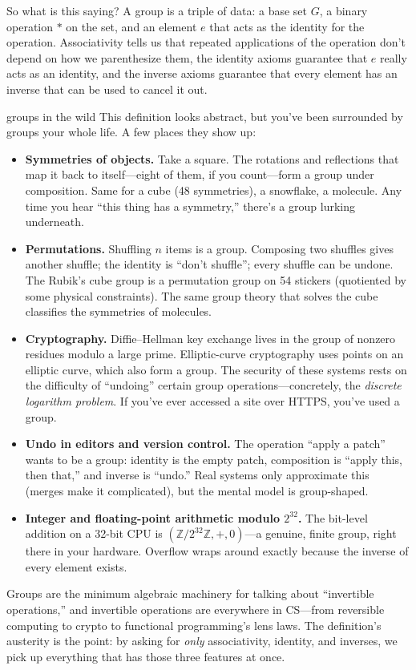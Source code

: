 \documentclass[11pt]{article}
\begin{document}
So what is this saying? A group is a triple of data: a base set $G$, a binary operation $*$ on the set, and an element $e$ that acts as the identity for the operation. Associativity tells us that repeated applications of the operation don't depend on how we parenthesize them, the identity axioms guarantee that $e$ really acts as an identity, and the inverse axioms guarantee that every element has an inverse that can be used to cancel it out.

\begin{sidebar}{groups in the wild}
This definition looks abstract, but you've been surrounded by groups your whole life. A few places they show up:

\begin{itemize}
  \item \textbf{Symmetries of objects.} Take a square. The rotations and reflections that map it back to itself---eight of them, if you count---form a group under composition. Same for a cube (48 symmetries), a snowflake, a molecule. Any time you hear ``this thing has a symmetry,'' there's a group lurking underneath.
  \item \textbf{Permutations.} Shuffling $n$ items is a group. Composing two shuffles gives another shuffle; the identity is ``don't shuffle''; every shuffle can be undone. The Rubik's cube group is a permutation group on 54 stickers (quotiented by some physical constraints). The same group theory that solves the cube classifies the symmetries of molecules.
  \item \textbf{Cryptography.} Diffie--Hellman key exchange lives in the group of nonzero residues modulo a large prime. Elliptic-curve cryptography uses points on an elliptic curve, which also form a group. The security of these systems rests on the difficulty of ``undoing'' certain group operations---concretely, the \emph{discrete logarithm problem}. If you've ever accessed a site over HTTPS, you've used a group.
  \item \textbf{Undo in editors and version control.} The operation ``apply a patch'' wants to be a group: identity is the empty patch, composition is ``apply this, then that,'' and inverse is ``undo.'' Real systems only approximate this (merges make it complicated), but the mental model is group-shaped.
  \item \textbf{Integer and floating-point arithmetic modulo $2^{32}$.} The bit-level addition on a 32-bit CPU is $(\mathbb{Z}/2^{32}\mathbb{Z}, +, 0)$---a genuine, finite group, right there in your hardware. Overflow wraps around exactly because the inverse of every element exists.
\end{itemize}

Groups are the minimum algebraic machinery for talking about ``invertible operations,'' and invertible operations are everywhere in CS---from reversible computing to crypto to functional programming's lens laws. The definition's austerity is the point: by asking for \emph{only} associativity, identity, and inverses, we pick up everything that has those three features at once.
\end{sidebar}
\end{document}
